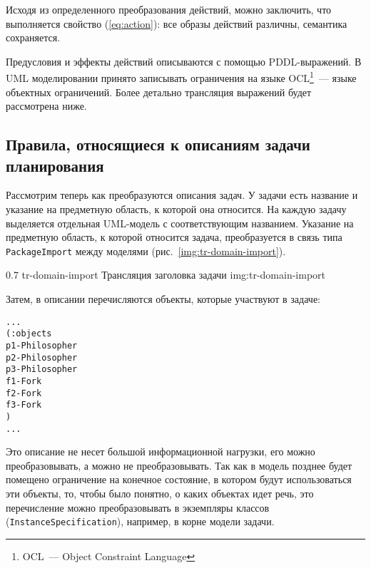 Исходя из определенного преобразования действий, можно заключить, что выполняется свойство (\ref{eq:action}): все образы действий различны, семантика сохраняется.

Предусловия и эффекты действий описываются с помощью PDDL-выражений.
В UML моделировании принято записывать ограничения на языке OCL\footnote{OCL~--- Object Constraint Language}~--- языке объектных ограничений. Более детально трансляция выражений будет рассмотрена ниже.

\subsection{Правила, относящиеся к описаниям задачи планирования}

Рассмотрим теперь как преобразуются описания задач.
У задачи есть название и указание на предметную область, к которой она относится. 
На каждую задачу выделяется отдельная UML-модель с соответствующим названием.
Указание на предметную область, к которой относится задача, преобразуется в связь типа \texttt{PackageImport} между моделями (рис.~\ref{img:tr-domain-import}).

{0.7}
{tr-domain-import}
{Трансляция заголовка задачи}
{img:tr-domain-import}

Затем, в описании перечисляются объекты, которые участвуют в задаче:

\begin{mdframed}[style=excode]
\begin{alltt}
  ...
  (:objects
      p1 - Philosopher
      p2 - Philosopher
      p3 - Philosopher
      f1 - Fork
      f2 - Fork
      f3 - Fork
  )
  ...
\end{alltt}
\end{mdframed}

Это описание не несет большой информационной нагрузки, его можно преобразовывать, а можно не преобразовывать. 
Так как в модель позднее будет помещено ограничение на конечное состояние, в котором будут использоваться эти объекты, то, чтобы было понятно, о каких объектах идет речь, это перечисление можно преобразовывать в экземпляры классов (\texttt{InstanceSpecification}), например, в корне модели задачи.

